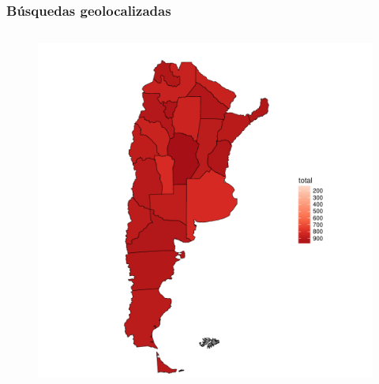 \begin{frame}[t]\frametitle{Búsquedas geolocalizadas}

\begin{columns}
    \begin{column}{0.30\textwidth}
        \begin{figure}
            \includegraphics[width=\linewidth]{../src/images/mapaprovincias.pdf}
            \label{fig:mapaProvincias}
        \end{figure}
    \end{column}


\end{columns}
\end{frame}
